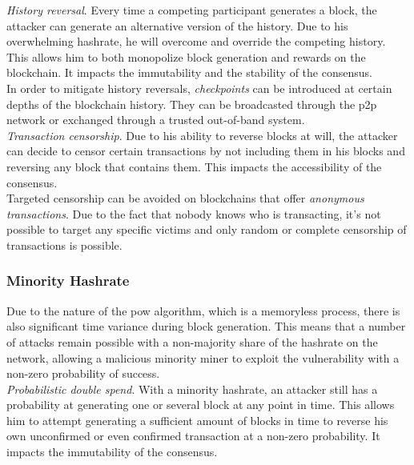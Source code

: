 \documentclass[12pt,a4paper]{article}
\begin{document}
\textit{History reversal}. Every time a competing participant generates a block, the attacker can generate an alternative version of the history. Due to his overwhelming \gls{hashrate}, he will overcome and override the competing history. This allows him to both monopolize block generation and rewards on the \gls{blockchain}. It impacts the immutability and the stability of the \gls{consensus}.\\

In order to mitigate history reversals, \textit{checkpoints} can be introduced at certain depths of the blockchain history. They can be broadcasted through the \acrshort{p2p} network or exchanged through a trusted out-of-band system.\\

\textit{Transaction censorship}. Due to his ability to reverse blocks at will, the attacker can decide to censor certain \glspl{transaction} by not including them in his blocks and reversing any block that contains them. This impacts the accessibility of the \gls{consensus}.\\

Targeted censorship can be avoided on blockchains that offer \textit{anonymous transactions}. Due to the fact that nobody knows who is transacting, it's not possible to target any specific victims and only random or complete censorship  of transactions is possible.\\

\subsubsection{Minority Hashrate}

Due to the nature of the \acrshort{pow} algorithm, which is a memoryless process, there is also significant time variance during block generation. This means that a number of attacks remain possible with a non-majority share of the \gls{hashrate} on the network, allowing a malicious minority miner to exploit the vulnerability with a non-zero probability of success.\\

\textit{Probabilistic double spend}. With a minority \gls{hashrate}, an attacker still has a probability at generating one or several block at any point in time. This allows him to attempt generating a sufficient amount of blocks in time to reverse his own unconfirmed or even confirmed \gls{transaction} at a non-zero probability. It impacts the immutability of the \gls{consensus}.\\
\end{document}
